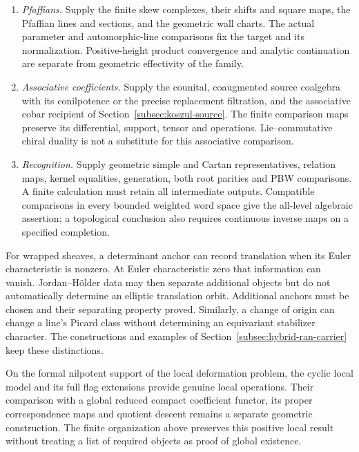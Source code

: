 \begin{enumerate}
  braided tensors give different equations. A product alone gives
  neither cooperation nor a primitive projection. In a connected
  cocommutative ordinary realization over characteristic zero,
  the Eulerian projection has the hypotheses of
  Section~\ref{subsec:primitive-recognition}. The invariant Lie
  form, its radical and its generated Hopf ideal are distinct from
  any separately supplied full Hopf pairing.
\item \emph{Pfaffians.} Supply the finite skew complexes, their
  shifts and square maps, the Pfaffian lines and sections, and the
  geometric wall charts. The actual parameter and automorphic-line
  comparisons fix the target and its normalization. Positive-height
  product convergence and analytic continuation are separate from
  geometric effectivity of the family.
\item \emph{Associative coefficients.} Supply the counital,
  coaugmented source coalgebra with its conilpotence or the precise
  replacement filtration, and the associative cobar recipient of
  Section~\ref{subsec:koszul-source}. The finite comparison maps
  preserve its differential, support, tensor and operations.
  Lie--commutative chiral duality is not a substitute for this
  associative comparison.
\item \emph{Recognition.} Supply geometric simple and Cartan
  representatives, relation maps, kernel equalities, generation,
  both root parities and PBW comparisons. A finite calculation must
  retain all intermediate outputs. Compatible comparisons in every
  bounded weighted word space give the all-level algebraic
  assertion; a topological conclusion also requires continuous
  inverse maps on a specified completion.
\end{enumerate}

For wrapped sheaves, a determinant anchor can record translation
when its Euler characteristic is nonzero. At Euler characteristic
zero that information can vanish. Jordan--H\"older data may then
separate additional objects but do not automatically determine an
elliptic translation orbit. Additional anchors must be chosen and
their separating property proved. Similarly, a change of origin can
change a line's Picard class without determining an equivariant
stabilizer character. The constructions and examples of
Section~\ref{subsec:hybrid-ran-carrier} keep these distinctions.

On the formal nilpotent support of the local deformation problem,
the cyclic local model and
its full flag extensions provide genuine local operations. Their
comparison with a global reduced compact coefficient functor, its
proper correspondence maps and quotient descent remains a separate
geometric construction. The finite organization above preserves
this positive local result without treating a list of required
objects as proof of global existence.

